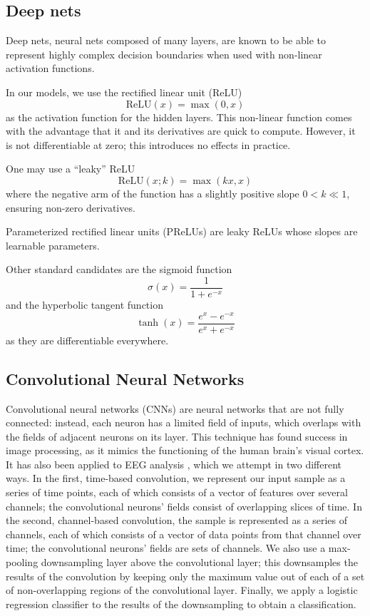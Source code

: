 \documentclass{article} %
\begin{document}
\subsection{Deep nets}
Deep nets, neural nets composed of many layers, are known to be able to represent highly complex decision boundaries when used with non-linear activation functions.

In our models, we use the rectified linear unit (ReLU) \cite{ICML:2010NairH10}
\[ \mathrm{ReLU}(x) = \max(0, x) \]
as the activation function for the hidden layers. This non-linear function comes with the advantage that it and its derivatives are quick to compute. However, it is not differentiable at zero; this introduces no effects in practice.

One may use a ``leaky'' ReLU
\[ \mathrm{ReLU}(x; k) = \max(kx, x) \]
where the negative arm of the function has a slightly positive slope $0 < k \ll 1$, ensuring non-zero derivatives.

Parameterized rectified linear units (PReLUs) \cite{DBLP:journals/corr/HeZR015} are leaky ReLUs whose slopes are learnable parameters.

Other standard candidates are the sigmoid function
\[ \sigma(x) = \frac{1}{1+e^{-x}} \]
and the hyperbolic tangent function
\[ \tanh(x) = \frac{e^x - e^{-x}}{e^x + e^{-x}} \]
as they are differentiable everywhere.


\subsection{Convolutional Neural Networks}
Convolutional neural networks (CNNs) \cite{DBLP:conf/nips/KrizhevskySH12} are neural networks that are not fully connected: instead, each neuron has a limited field of inputs, which overlaps with the fields of adjacent neurons on its layer.  This technique has found success in image processing, as it mimics the functioning of the human brain's visual cortex.  It has also been applied to EEG analysis \cite{DBLP:journals/pami/CecottiG11}, which we attempt in two different ways.  In the first, time-based convolution, we represent our input sample as a series of time points, each of which consists of a vector of features over several channels; the convolutional neurons' fields consist of overlapping slices of time.  In the second, channel-based convolution, the sample is represented as a series of channels, each of which consists of a vector of data points from that channel over time; the convolutional neurons' fields are sets of channels.  We also use a max-pooling downsampling layer above the convolutional layer; this downsamples the results of the convolution by keeping only the maximum value out of each of a set of non-overlapping regions of the convolutional layer.  Finally, we apply a logistic regression classifier to the results of the downsampling to obtain a classification.
\end{document}
